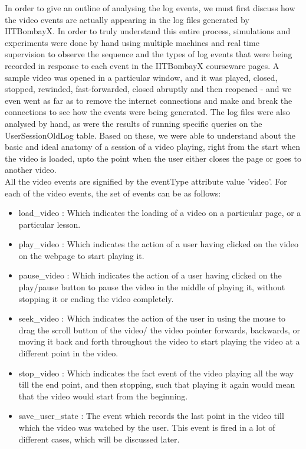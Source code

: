 \documentclass[16pt]{report}
\begin{document}
In order to give an outline of analysing the log events, we must first discuss how the video events are actually appearing in the log files generated by IITBombayX. In order to truly understand this entire process, simulations and experiments were done by hand using multiple machines and real time supervision to observe the sequence and the types of log events that were being recorded in response to each event in the IITBombayX courseware pages. A sample video was opened in a particular window, and it was played, closed, stopped, rewinded, fast-forwarded, closed abruptly and then reopened - and we even went as far as to remove the internet connections and make and break the connections to see how the events were being generated. The log files were also analysed by hand, as were the results of running specific queries on the UserSessionOldLog table. Based on these, we were able to understand about the basic and ideal anatomy of a session of a video playing, right from the start when the video is loaded, upto the point when the user either closes the page or goes to another video.\\

All the video events are signified by the eventType attribute value 'video'. For each of the video events, the set of events can be as follows:

\begin{itemize}
\item load\_video : Which indicates the loading of a video on a particular page, or a particular lesson.

\item play\_video : Which indicates the action of a user having clicked on the video on the webpage to start playing it.

\item pause\_video : Which indicates the action of a user having clicked on the play/pause button to pause the video in the middle of playing it, without stopping it or ending the video completely.

\item seek\_video : Which indicates the action of the user in using the mouse to drag the scroll button of the video/ the video pointer forwards, backwards, or moving it back and forth throughout the video to start playing the video at a different point in the video.

\item stop\_video : Which indicates the fact event of the video playing all the way till the end point, and then stopping, such that playing it again would mean that the video would start from the beginning.

\item save\_user\_state : The event which records the last point in the video till which the video was watched by the user. This event is fired in a lot of different cases, which will be discussed later.
\end{itemize}
\end{document}
